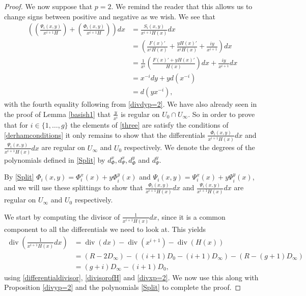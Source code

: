 \documentclass[draft, 11pt]{article} %
\theoremstyle{plain}
\theoremstyle{remark}
\DeclareMathOperator{\di}{div}
\begin{document}
\begin{proof}
We now suppose that $p=2$.
We remind the reader that this allows us to change signs between positive and negative as we wish.
We see that
\begin{align*}
\left( \left( \frac{ \Psi_i(x,y)}{x^{i+1}H} \right) + \left( \frac{\Phi_i(x,y)}{x^{i+1}H} \right) \right) dx & =  \frac{S_i(x,y)}{x^{i+1}H(x)}dx \\
& =  \left( \frac{F(x)'}{x^iH(x)} + \frac{yH(x)'}{x^iH(x)} + \frac{iy}{x^{i+1}} \right) dx \\
& =  \frac{1}{x^i}\left( \frac{F(x)' + yH(x)'}{H(x)} \right) dx + \frac{iy}{x^{i+1}}dx \\
& =  x^{-i}dy + yd \left( x^{-i}\right) \\
& =  d\left( yx^{-i}\right),
\end{align*}
with the fourth equality following from \eqref{divdyp=2}.
We have also already seen in the proof of Lemma \ref{basish1} that $\frac{y}{x^i}$ is regular on $U_0 \cap U_\infty$.
So in order to prove that for $i\in \{1, \ldots, g\}$ the elements of \eqref{three} are satisfy the conditions of \eqref{derhamconditions} it only remains to show that the differentials $\frac{\Phi_i(x,y)}{x^{i+1}H(x)}dx$ and $\frac{\Psi_i(x,y)}{x^{i+1}H(x)}dx$ are regular on $U_\infty$ and $U_0$ respectively.
We denote the degrees of the polynomials defined in \eqref{Split} by $d_{\Phi}^x, d_{\Psi}^x, d_{\Phi}^y$ and $d_{\Psi}^y$.


By \eqref{Split} $\Phi_i(x,y) = \Phi_i^x(x) + y\Phi_i^y(x)$ and $\Psi_i (x,y)= \Psi_i^x(x) + y\Psi_i^y(x)$, and we will use these splittings to show that $\frac{ \Phi_i(x,y) }{x^{i+1}H(x)}dx$ and $\frac{\Psi_i(x,y) }{x^{i+1}H(x)}dx$ are regular on $U_\infty$ and $U_0$ respectively.

We start by computing the divisor of $\frac{1}{x^{i+1}H(x)}dx$, since it is a common component to all the differentials we need to look at.
This yields
\begin{align*}
\di \left( \frac{1}{x^{i+1}H(x)}dx \right) & = \di(dx) - \di (x^{i+1}) - \di (H(x)) \nonumber \\
& = (R-2D_\infty) - ((i+1)D_0 - (i+1)D_\infty) - (R - (g+1)D_\infty) \nonumber \\
& = (g+i)D_\infty - (i+1)D_0,
\end{align*}
using \eqref{differentialdivisor}, \eqref{divisorofH} and \eqref{divxp=2}.
We now use this along with Proposition \ref{divyp=2} and the polynomials \eqref{Split} to complete the proof.


\end{proof}
\end{document}
